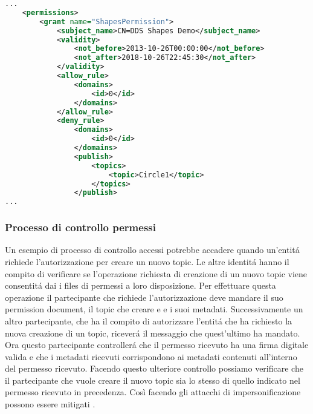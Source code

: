 \vspace{5mm} %
\begin{lstlisting}[language=XML, caption=Estratto di permissions
    document{,} tratto da documento di riferimento 
    del DDS Security vers. 1.1 \cite{ddssecurity1.1}.
    , label=XML permission file,
    captionpos=b]
...
    <permissions>
        <grant name="ShapesPermission">
            <subject_name>CN=DDS Shapes Demo</subject_name>
            <validity>
                <not_before>2013-10-26T00:00:00</not_before>
                <not_after>2018-10-26T22:45:30</not_after>
            </validity>
            <allow_rule>
                <domains>
                    <id>0</id>
                </domains>
            </allow_rule>
            <deny_rule>
                <domains>
                    <id>0</id>
                </domains>
                <publish>
                    <topics>
                        <topic>Circle1</topic>
                    </topics>
                </publish>
...
    \end{lstlisting}
\vspace{5mm}

\subsubsection{Processo di controllo permessi}
Un esempio di processo di controllo accessi potrebbe accadere
quando un'entitá richiede l'autorizzazione per creare un nuovo topic.
Le altre identitá hanno il compito di verificare se l'operazione 
richiesta di creazione di un nuovo topic viene consentitá
dai i files di permessi a loro disposizione. Per effettuare 
questa operazione il partecipante che richiede l'autorizzazione 
deve mandare il suo permission document, il topic che creare e 
e i suoi metadati. Successivamente un altro partecipante,
che ha il compito di autorizzare l'entitá che ha richiesto 
la nuova creazione di un topic, riceverá il messaggio
che quest'ultimo ha mandato. Ora questo partecipante
controllerá che il permesso 
ricevuto ha una firma digitale valida e che i metadati 
ricevuti corrispondono ai metadati contenuti all'interno 
del permesso ricevuto. Facendo questo ulteriore controllo 
possiamo verificare che il partecipante che vuole creare il 
nuovo topic sia lo stesso di quello indicato nel permesso 
ricevuto in precedenza. Così facendo gli attacchi di 
impersonificazione possono essere mitigati 
\cite{DBLP:conf/asiaccs/WangLG24}.

